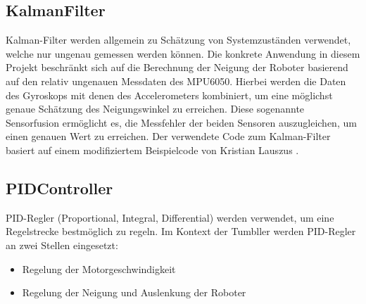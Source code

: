 \subsection{KalmanFilter}
Kalman-Filter werden allgemein zu Schätzung von Systemzuständen verwendet,
welche nur ungenau gemessen werden können.
%
Die konkrete Anwendung in diesem Projekt beschränkt sich auf die Berechnung
der Neigung der Roboter basierend auf den relativ ungenauen Messdaten des MPU6050.
%
Hierbei werden die Daten des Gyroskops mit denen des Accelerometers kombiniert,
um eine möglichst genaue Schätzung des Neigungswinkel zu erreichen\cite{digikey-kalman}.
%
Diese sogenannte Sensorfusion ermöglicht es,
die Messfehler der beiden Sensoren auszugleichen,
um einen genauen Wert zu erreichen.
%
Der verwendete Code zum Kalman-Filter basiert auf einem modifiziertem Beispielcode von Kristian Lauszus \cite{lauszus}.

\subsection{PIDController}
PID-Regler (Proportional, Integral, Differential) werden verwendet,
um eine Regelstrecke bestmöglich zu regeln.
%
Im Kontext der Tumbller werden PID-Regler an zwei Stellen eingesetzt:
\begin{itemize}
    \item Regelung der Motorgeschwindigkeit
    \item Regelung der Neigung und Auslenkung der Roboter
\end{itemize}

